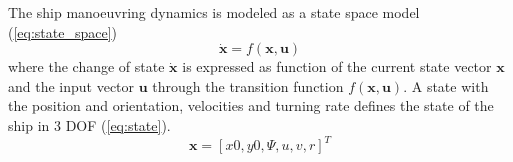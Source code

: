 \noindent The ship manoeuvring dynamics is modeled as a state space model (\autoref{eq:state_space})
\begin{equation}
    \dot{\mathbf{x}}=f(\mathbf{x},\mathbf{u})
    \label{eq:state_space}
\end{equation}
where the change of state $\dot{\mathbf{x}}$ is expressed as function of the current state vector $\mathbf{x}$ and the input vector $\mathbf{u}$ through the transition function $f(\mathbf{x},\mathbf{u})$. A state with the position and orientation, velocities and turning rate defines the state of the ship in 3 DOF (\autoref{eq:state}). 
\begin{equation}
    \mathbf{x} = [x0,y0,\Psi, u,v,r]^T
    \label{eq:state}
\end{equation}
